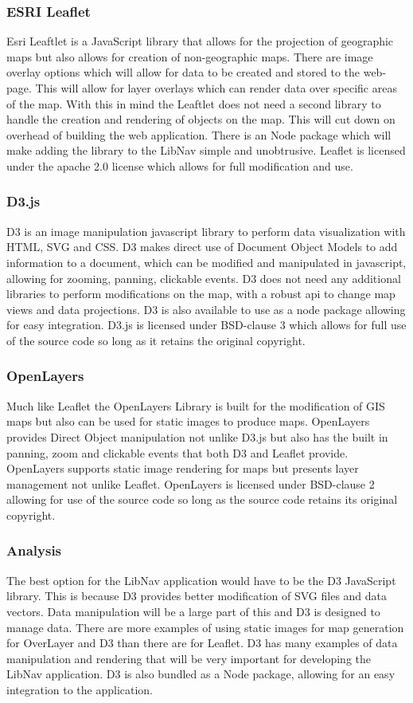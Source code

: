 \documentclass[letterpaper,10pt,titlepage, onecolumn, compsoc]{IEEEtran}
\begin{document}
\subsubsection{ESRI Leaflet}
Esri Leaftlet is a JavaScript library that allows for the projection of geographic maps but also allows for creation of non-geographic maps. There are image overlay options which will allow for data to be created and stored to the web-page. This will allow for layer overlays which can render data over specific areas of the map. With this in mind the Leaftlet does not need a second library to handle the creation and rendering of objects on the map. This will cut down on overhead of building the web application. There is an Node package which will make adding the library to the LibNav simple and unobtrusive. Leaflet is licensed under the apache 2.0 license which allows for full modification and use.\cite{leaflet}
\subsubsection{D3.js}
D3 is an image manipulation javascript library to perform data visualization with HTML, SVG and CSS.  D3 makes direct use of Document Object Models to add information to a document, which can be modified and manipulated in javascript, allowing for zooming, panning, clickable events. D3 does not need any additional libraries to perform modifications on the map, with a robust api to change map views and data projections.  D3 is also available to use as a node package allowing for easy integration. D3.js is licensed under BSD-clause 3 which allows for full use of the source code so long as it retains the original copyright.\cite{d3.js}

\subsubsection{OpenLayers}
Much like Leaflet the OpenLayers Library is built for the modification of GIS maps but also can be used for static images to produce maps. OpenLayers provides Direct Object manipulation not unlike D3.js but also has the built in panning, zoom and clickable events that both D3 and Leaflet provide. OpenLayers supports static image rendering for maps but presents layer management not unlike Leaflet. OpenLayers is licensed under BSD-clause 2 allowing for use of the source code so long as the source code retains its original copyright.\cite{openlayers}
\subsubsection{Analysis}
The best option for the LibNav application would have to be the D3 JavaScript library. This is because D3 provides better modification of SVG files and data vectors. Data manipulation will be a large part of this and D3 is designed to manage data. There are more examples of using static images for map generation for OverLayer and D3 than there are for Leaflet. D3 has many examples of data manipulation and rendering that will be very important for developing the LibNav application. D3 is also bundled as a Node package, allowing for an easy integration to the application.
\end{document}
